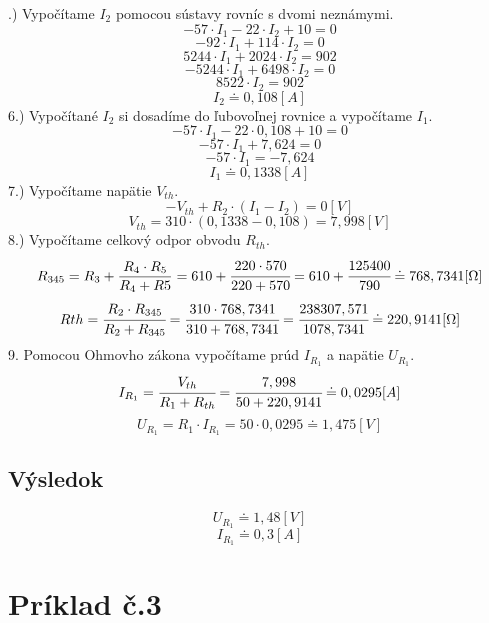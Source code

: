 \documentclass{article}
\begin{document}
\begin{center}
	.) Vypočítame $I_2$ pomocou sústavy rovníc s dvomi neznámymi.
	$$- 57 \cdot I_1 - 22 \cdot I_2 + 10 = 0$$
	$$- 92 \cdot I_1 + 114 \cdot I_2 = 0$$
	\vskip 0.2cm
	$$5244 \cdot I_1 + 2024 \cdot I_2 = 902$$
	$$- 5244 \cdot I_1 + 6498 \cdot I_2 = 0$$
	\vskip 0.2cm
	$$8522 \cdot I_2 = 902$$
	$$I_2 \doteq 0,108 [A]$$ 
	\vskip 0.5cm
	6.) Vypočítané $I_2$ si dosadíme do ľubovoľnej rovnice a vypočítame $I_1$.
	$$- 57 \cdot I_1 - 22 \cdot 0,108 + 10 = 0$$
	$$- 57 \cdot I_1 + 7,624 = 0$$
	\vskip 0.2cm
	$$- 57 \cdot I_1 = - 7,624$$
	$$I_1 \doteq  0,1338 [A]$$ 
	\vskip 0.5cm
	7.) Vypočítame napätie $V_{th}$.
	$$- V_{th} + R_2 \cdot (I_1 - I_2) = 0 [V]$$
	$$V_{th} = 310 \cdot (0,1338 - 0,108) =  7,998 [V]$$
	\vskip 0.5cm
	8.) Vypočítame celkový odpor obvodu $R_{th}$.
	$$R_{345} = R_3 + \frac{R_4 \cdot R_5}{R_4 + R5} = 610 + \cfrac{220 \cdot 570}{220 + 570} = 610 + \cfrac{125400}{790} \doteq 768,7341 [\Omega]$$
	$$R{th} = \cfrac{R_2 \cdot R_{345}}{R_2 + R_{345}} = \cfrac{310 \cdot 768,7341}{310 + 768,7341} = \cfrac{238307,571}{1078,7341} \doteq 220,9141 [\Omega]$$
	\vskip 0.5cm
	9. Pomocou Ohmovho zákona vypočítame prúd $I_{R_1}$ a napätie $U_{R_1}$.
	$$I_{R_1} = \cfrac{V_{th}}{R_1 + R_{th}} = \cfrac{7,998}{50 + 220,9141} \doteq  0,0295 [A]$$
	$$U_{R_1} = R_1 \cdot I_{R_1} = 50 \cdot 0,0295 \doteq 1,475 [V]$$
	\vskip 0.5cm
\end{center}
\subsection{Výsledok}
$$U_{R_1} \doteq 1,48 [V]$$
$$I_{R_1} \doteq 0,3 [A]$$
\newpage
\section{Príklad č.3}
\end{document}
